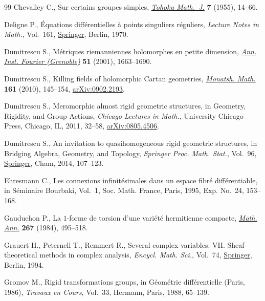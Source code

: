 \begin{thebibliography}{99}
Chevalley C., Sur certains groupes simples, \href{https://doi.org/10.2748/tmj/1178245104}{\textit{Tohoku Math.~J.}} \textbf{7}
 (1955), 14--66.

Deligne P., \'Equations diff\'erentielles \`a points singuliers r\'eguliers,
 \textit{Lecture Notes in Math.}, Vol.~161, \href{https://doi.org/10.1007/BFb0061194}{Springer}, Berlin, 1970.

Dumitrescu S., M\'etriques riemanniennes holomorphes en petite dimension,
 \href{https://doi.org/10.5802/aif.1870}{\textit{Ann. Inst. Fourier (Grenoble)}} \textbf{51} (2001), 1663--1690.

Dumitrescu S., Killing fields of holomorphic {C}artan geometries,
 \href{https://doi.org/10.1007/s00605-009-0135-x}{\textit{Monatsh. Math.}} \textbf{161} (2010), 145--154, \href{https://arxiv.org/abs/0902.2193}{arXiv:0902.2193}.

Dumitrescu S., Meromorphic almost rigid geometric structures, in Geometry,
 Rigidity, and Group Actions, \textit{Chicago Lectures in Math.}, University Chicago
 Press, Chicago, IL, 2011, 32--58, \href{https://arxiv.org/abs/0805.4506}{arXiv:0805.4506}.

Dumitrescu S., An invitation to quasihomogeneous rigid geometric structures, in
 Bridging Algebra, Geometry, and Topology, \textit{Springer Proc. Math.
 Stat.}, Vol.~96, \href{https://doi.org/10.1007/978-3-319-09186-0_7}{Springer}, Cham, 2014, 107--123.

Ehresmann C., Les connexions infinit\'esimales dans un espace fibr\'e
 diff\'erentiable, in S\'eminaire {B}ourbaki, {V}ol.~1, Soc. Math. France,
 Paris, 1995, Exp. No.~24, 153--168.

Gauduchon P., La {$1$}-forme de torsion d'une vari\'et\'e hermitienne compacte,
 \href{https://doi.org/10.1007/BF01455968}{\textit{Math. Ann.}} \textbf{267} (1984), 495--518.

Grauert H., Peternell T., Remmert R., Several complex variables. {VII}.
 Sheaf-theoretical methods in complex analysis, \textit{Encycl. Math. Sci.}, Vol.~74, \href{https://doi.org/10.1007/978-3-662-09873-8}{Springer}, Berlin, 1994.

Gromov M., Rigid transformations groups, in G\'eom\'etrie diff\'erentielle
 ({P}aris, 1986), \textit{Travaux en Cours}, Vol.~33, Hermann, Paris, 1988,
 65--139.


\end{thebibliography}
